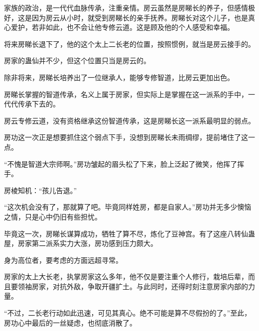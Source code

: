 \begin{this_body}
家族的政治，是一代代血脉传承，注重亲情。房云虽然是房睇长的养子，但感情极好，这是因为房云从小时，就受到房睇长的亲手抚养。房睇长对这个儿子，也是真心爱护，若非如此，也不会让他专修云道。这是顾及他的个人感受和幸福。

将来房睇长退下了，他的这个太上二长老的位置，按照惯例，就当是房云接手的。

房家的蛊仙并不少，但这个位置只当是房云的。

除非将来，房睇长培养出了一位继承人，能够专修智道，比房云更加出色。

房睇长掌握的智道传承，名义上属于房家，但实际上是掌握在这一派系的手中，一代代传承下去的。

房云专修云道，没有资格继承这份智道传承，这是房睇长这一派系最明显的弱点。

房功这一次正是想要抓住这个弱点下手，没想到房睇长未雨绸缪，提前堵住了这一点。

“不愧是智道大宗师啊。”房功皱起的眉头松了下来，脸上泛起了微笑，他挥了挥手。

房棱知机：“孩儿告退。”

“这次机会没有了，那就算了吧。毕竟同样姓房，都是自家人。”房功并无多少懊恼之情，只是心中仍旧有些担忧。

毕竟这一次，房睇长谋算成功，牺牲了算不尽，炼化了豆神宫。有了这座八转仙蛊屋，房家第二派系实力大涨，房功感到压力颇大。

身为高位者，要考虑的方面远超寻常。

房家的太上大长老，执掌房家这么多年，他不仅是要注重个人修行，栽培后辈，而且要领袖房家，对抗外敌，争取开疆扩土。与此同时，还得时刻注意房家内部的力量。

“不过，二长老行动如此迅速，可见其真心。绝不可能是算不尽假扮的了。”至此，房功心中最后的一丝疑虑，也彻底消散了。

\end{this_body}


